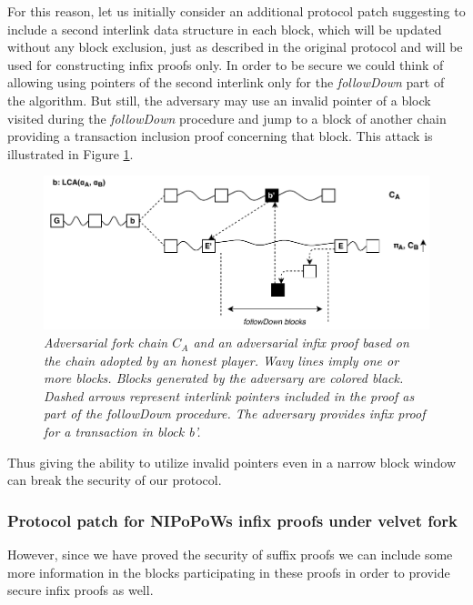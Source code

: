\documentclass[10pt,a4paper]{article}
\theoremstyle{plain}
\theoremstyle{definition}
\theoremstyle{lemma}
\theoremstyle{corollary}
\begin{document}
For this reason, let us initially consider an additional protocol patch suggesting to include
a second interlink data structure in each block, which will be updated without any block exclusion,
just as described in the original protocol and will be used for constructing infix proofs only. In
order to be secure we could think of allowing using pointers of the second interlink only for the
\textit{followDown} part of the algorithm. But still, the adversary may use an invalid pointer of a
block visited during the \textit{followDown} procedure and jump to a block of another chain providing 
a transaction inclusion proof concerning that block. This attack is illustrated in
Figure \ref{fig:infix_attack}.

\begin{figure}[h!]
	\begin{center}
		\includegraphics[scale=0.75]{figures/infix_attack.pdf}
	\end{center}
	\caption{\textit{Adversarial fork chain $C_A$ and an adversarial infix proof based on the chain
	 adopted by an honest player. Wavy lines imply one or more blocks. Blocks generated by the
	 adversary are colored black. Dashed arrows represent interlink pointers included in the proof
	 as part of the \textit{followDown} procedure. The adversary provides infix proof for a
	 transaction in block b'. }}
	\label{fig:infix_attack}
\end{figure}

Thus giving the ability to utilize invalid pointers even in a narrow block window can break the
security of our protocol. 

\subsubsection*{Protocol patch for NIPoPoWs infix proofs under velvet fork}
However, since we have proved the security of suffix proofs we can include some more information
in the blocks participating in these proofs in order to provide secure infix proofs as well.
 
\end{document}
